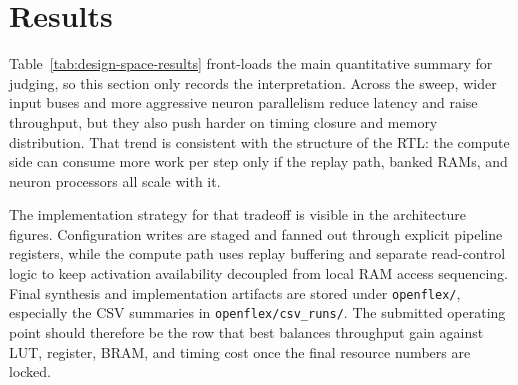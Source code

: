 \section{Results}

Table~\ref{tab:design-space-results} front-loads the main quantitative summary
for judging, so this section only records the interpretation. Across the sweep,
wider input buses and more aggressive neuron parallelism reduce latency and
raise throughput, but they also push harder on timing closure and memory
distribution. That trend is consistent with the structure of the RTL: the
compute side can consume more work per step only if the replay path, banked
RAMs, and neuron processors all scale with it.

The implementation strategy for that tradeoff is visible in the architecture
figures. Configuration writes are staged and fanned out through explicit
pipeline registers, while the compute path uses replay buffering and separate
read-control logic to keep activation availability decoupled from local RAM
access sequencing. Final synthesis and implementation artifacts are stored
under \texttt{openflex/}, especially the CSV summaries in
\texttt{openflex/csv\_runs/}. The submitted operating point should therefore be
the row that best balances throughput gain against LUT, register, BRAM, and
timing cost once the final resource numbers are locked.
